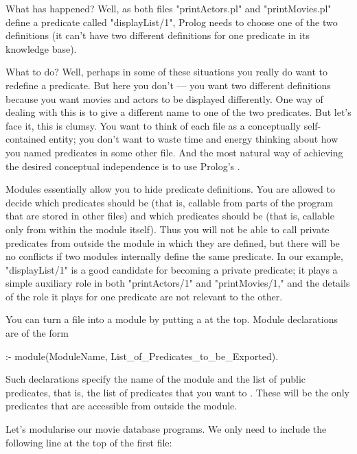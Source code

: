 What has happened? Well, as both files "printActors.pl"
and "printMovies.pl"  define a predicate called "displayList/1", Prolog
needs to choose one of the two definitions (it can't have two different
definitions for one predicate in its knowledge base).

What to do? Well, perhaps in some of these situations you really do
want to redefine a predicate.  But here you don't --- you want two
different definitions because you want movies and actors to be
displayed differently.  One way of dealing with this is to give a
different name to one of the two predicates.  But let's face it, this
is clumsy. You want to think of each file as a conceptually
self-contained entity; you don't want to waste time and energy
thinking about how you named predicates in some other file.  And the
most natural way of achieving the desired conceptual independence is
to use Prolog's .

Modules essentially allow you to hide predicate definitions. You are
allowed to decide which predicates should be  (that is,
callable from parts of the program that are stored in other files)
and which predicates should be  (that is, callable
only from within the module itself).  Thus you will not be able to
call private predicates from outside the module in which they are
defined, but there will be no conflicts if two modules internally
define the same predicate. In our example,  "displayList/1" is a good
candidate for becoming a private predicate; it plays a simple
auxiliary role in  both "printActors/1" and  "printMovies/1,"
and the  details of the
role it plays for one predicate are not relevant to the other.

You can turn a file into a module by putting a  at
the top. Module declarations are of the form   

\begin{LPNcodedisplay}
:- module(ModuleName,
          List_of_Predicates_to_be_Exported).
\end{LPNcodedisplay}
Such declarations  specify the name of the module and the list of public
predicates, that is, the list of predicates that you want to
. These will be the only predicates that are
accessible from outside the module.

Let's modularise our movie database programs. We only need to
include the following line at the top of the first file:

